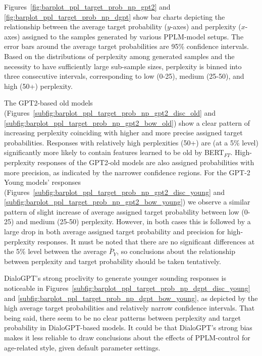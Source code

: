 Figures~\ref{fig:barplot_ppl_target_prob_np_gpt2} and \ref{fig:barplot_ppl_target_prob_np_dgpt} show bar charts depicting the relationship between the average target probability ($y$-axes) and perplexity ($x$-axes) assigned to the samples generated by various PPLM-model setups. The error bars around the average target probabilities are 95\% confidence intervals. Based on the distributions of perplexity among generated samples and the necessity to have sufficiently large sub-sample sizes, perplexity is binned into three consecutive intervals, corresponding to low (0-25), medium (25-50), and high (50+) perplexity. 

The GPT2-based old models (Figures~\ref{subfig:barplot_ppl_target_prob_np_gpt2_disc_old} and \ref{subfig:barplot_ppl_target_prob_np_gpt2_bow_old}) show a clear pattern of increasing perplexity coinciding with higher and more precise assigned target probabilities. Responses with relatively high perplexities (50+) are (at a 5\% level) significantly more likely to contain features learned to be old by BERT$_{FT}$. High-perplexity responses of the GPT2-old models are also assigned probabilities with more precision, as indicated by the narrower confidence regions. For the GPT-2 Young models' responses (Figures~\ref{subfig:barplot_ppl_target_prob_np_gpt2_disc_young} and \ref{subfig:barplot_ppl_target_prob_np_gpt2_bow_young}) we observe a similar pattern of slight increase of average assigned target probability between low (0-25) and medium (25-50) perplexity. However, in both cases this is followed by a large drop in both average assigned target probability and precision for high-perplexity responses. It must be noted that there are no significant differences at the 5\% level between the average $\bar{P}_Y$, so conclusions about the relationship between perplexity and target probability should be taken tentatively.


DialoGPT's strong proclivity to generate younger sounding responses is noticeable in Figures~\ref{subfig:barplot_ppl_target_prob_np_dgpt_disc_young} and \ref{subfig:barplot_ppl_target_prob_np_dgpt_bow_young}, as depicted by the high average target probabilities and relatively narrow confidence intervals. That being said, there seem to be no clear patterns between perplexity and target probability in DialoGPT-based models. It could be that DialoGPT's strong bias makes it less reliable to draw conclusions about the effects of PPLM-control for age-related style, given default parameter settings.

